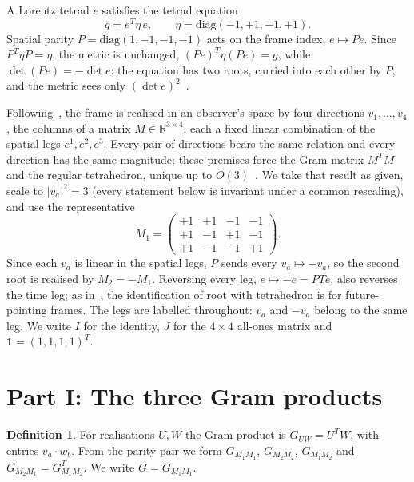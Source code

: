 \documentclass[twocolumn]{iopjournal}
\theoremstyle{definition}
\newtheorem{definition}{Definition}
\theoremstyle{remark}
\begin{document}
A Lorentz tetrad $e$ satisfies the tetrad equation
\begin{equation}
  g = e^T\eta\,e, \qquad \eta = \mathrm{diag}(-1,+1,+1,+1).
  \label{eq:tetrad}
\end{equation}
Spatial parity $P = \mathrm{diag}(1,-1,-1,-1)$ acts on the frame
index, $e \mapsto Pe$. Since $P^T\eta P = \eta$, the metric is
unchanged, $(Pe)^T\eta(Pe) = g$, while $\det(Pe) = -\det e$: the
equation has two roots, carried into each other by $P$, and the
metric sees only $(\det e)^2$~\cite{NelsonScheme}.

Following~\cite{NelsonLetter1,NelsonScheme}, the frame is realised
in an observer's space by four directions $v_1,\dots,v_4$, the
columns of a matrix $M \in \mathbb{R}^{3\times4}$, each a fixed linear
combination of the spatial legs $e^1, e^2, e^3$. Every pair of
directions bears the same relation and every direction has the same
magnitude; these premises force the Gram matrix $M^TM$ and the
regular tetrahedron, unique up to $O(3)$~\cite{NelsonForced}. We take
that result as given, scale to $|v_a|^2 = 3$ (every statement below
is invariant under a common rescaling), and use the representative
\begin{equation}
  M_1 = \begin{pmatrix}
    +1 & +1 & -1 & -1 \\
    +1 & -1 & +1 & -1 \\
    +1 & -1 & -1 & +1
  \end{pmatrix}.
  \label{eq:M1}
\end{equation}
Since each $v_a$ is linear in the spatial legs, $P$ sends every
$v_a \mapsto -v_a$, so the second root is realised by $M_2 = -M_1$.
Reversing every leg, $e \mapsto -e = PTe$, also reverses the time
leg; as in~\cite{NelsonScheme}, the identification of root with
tetrahedron is for future-pointing frames. The legs are labelled
throughout: $v_a$ and $-v_a$ belong to the same leg. We write $I$ for the identity,
$J$ for the $4\times4$ all-ones matrix and $\mathbf{1} = (1,1,1,1)^T$.


\section*{Part I: The three Gram products}

\begin{definition}
For realisations $U, W$ the Gram product is
$G_{UW} = U^T W$, with entries $v_a \cdot w_b$. From the parity pair
we form $G_{M_1M_1}$, $G_{M_2M_2}$, $G_{M_1M_2}$ and
$G_{M_2M_1} = G_{M_1M_2}^T$. We write $G = G_{M_1M_1}$.
\end{definition}
\end{document}
